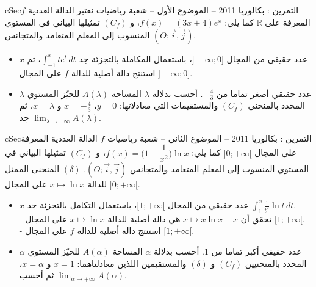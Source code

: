 \documentclass[12pt,a4paper]{article}
\newenvironment{BOX}[2]{\begin{otherlanguage}{english}\begin{arbox}{#1}{#2}}{\end{arbox}\end{otherlanguage}}
\newcounter{exo}
\newenvironment{tamrin}[1]{\stepcounter{exo}\begin{BOX}{cSec}{التمرين \theexo: #1}}{\end{BOX}}
\newcommand{\R}{\mathbb{R}}
\newenvironment{sq}{\begin{itemize}[leftmargin=2.4em,itemsep=3pt]}{\end{itemize}}
\newcommand{\qa}{\item[(أ)]}\newcommand{\qb}{\item[(ب)]}\newcommand{\qc}{\item[(جـ)]}\newcommand{\qd}{\item[(د)]}\newcommand{\qe}{\item[(هـ)]}
\begin{document}
\begin{tamrin}{بكالوريا 2011 -- الموضوع الأول -- شعبة رياضيات}
نعتبر الدالة العددية $f$ المعرفة على $\R$ كما يلي: $f(x)=(3x+4)e^x$، و $(C_f)$ تمثيلها البياني في المستوي المنسوب إلى المعلم المتعامد والمتجانس $(O;\vec i,\vec j)$.
\begin{sq}
\qa $x$ عدد حقيقي من المجال $]-\infty;0]$، باستعمال المكاملة بالتجزئة جد $\displaystyle\int_{-1}^xte^t\,dt$، ثم استنتج دالة أصلية للدالة $f$ على المجال $]-\infty;0]$.
\qb $\lambda$ عدد حقيقي أصغر تماما من $-\frac43$. أحسب بدلالة $\lambda$ المساحة $A(\lambda)$ للحيّز المستوي المحدد بالمنحنى $(C_f)$ والمستقيمات التي معادلاتها: $y=0$، $x=-\frac43$ و $x=\lambda$، ثم جد $\displaystyle\lim_{\lambda\to-\infty}A(\lambda)$.
\end{sq}
\end{tamrin}

\begin{tamrin}{بكالوريا 2011 -- الموضوع الثاني -- شعبة رياضيات}
$f$ الدالة العددية المعرفة على المجال $]0;+\infty[$ كما يلي: $f(x)=\Big(1-\dfrac{1}{x^2}\Big)\ln x$، و $(C_f)$ تمثيلها البياني في المستوي المنسوب إلى المعلم المتعامد والمتجانس $(O;\vec i,\vec j)$.
$(\delta)$ المنحنى الممثل للدالة $x\mapsto\ln x$ على المجال $]0;+\infty[$.
\begin{sq}
\qa $x$ عدد حقيقي من المجال $[1;+\infty[$، باستعمال التكامل بالتجزئة جد $\displaystyle\int_1^x\frac{1}{t^2}\ln t\,dt$.
\\- تحقق أن $x\mapsto x\ln x-x$ هي دالة أصلية للدالة $x\mapsto\ln x$ على المجال $[1;+\infty[$.
\\- استنتج دالة أصلية للدالة $f$ على المجال $[1;+\infty[$.
\qb $\alpha$ عدد حقيقي أكبر تماما من $1$. أحسب بدلالة $\alpha$ المساحة $A(\alpha)$ للحيّز المستوي المحدد بالمنحنيين $(C_f)$ و $(\delta)$ والمستقيمين اللذين معادلتاهما: $x=1$ و $x=\alpha$، ثم أحسب $\displaystyle\lim_{\alpha\to+\infty}A(\alpha)$.
\end{sq}
\end{tamrin}
\end{document}

